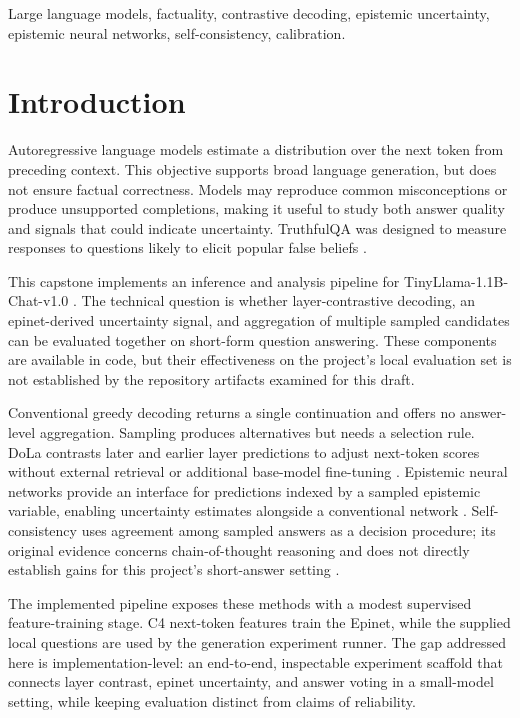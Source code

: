 \documentclass[conference]{IEEEtran}
\begin{document}
\begin{IEEEkeywords}
Large language models, factuality, contrastive decoding, epistemic uncertainty, epistemic neural networks, self-consistency, calibration.
\end{IEEEkeywords}

\section{Introduction}
Autoregressive language models estimate a distribution over the next token from preceding context. This objective supports broad language generation, but does not ensure factual correctness. Models may reproduce common misconceptions or produce unsupported completions, making it useful to study both answer quality and signals that could indicate uncertainty. TruthfulQA was designed to measure responses to questions likely to elicit popular false beliefs \cite{lin2022truthfulqa}.

This capstone implements an inference and analysis pipeline for TinyLlama-1.1B-Chat-v1.0 \cite{zhang2024tinyllama}. The technical question is whether layer-contrastive decoding, an epinet-derived uncertainty signal, and aggregation of multiple sampled candidates can be evaluated together on short-form question answering. These components are available in code, but their effectiveness on the project's local evaluation set is not established by the repository artifacts examined for this draft.

Conventional greedy decoding returns a single continuation and offers no answer-level aggregation. Sampling produces alternatives but needs a selection rule. DoLa contrasts later and earlier layer predictions to adjust next-token scores without external retrieval or additional base-model fine-tuning \cite{chuang2024dola}. Epistemic neural networks provide an interface for predictions indexed by a sampled epistemic variable, enabling uncertainty estimates alongside a conventional network \cite{osband2021enn}. Self-consistency uses agreement among sampled answers as a decision procedure; its original evidence concerns chain-of-thought reasoning and does not directly establish gains for this project's short-answer setting \cite{wang2023selfconsistency}.

The implemented pipeline exposes these methods with a modest supervised feature-training stage. C4 next-token features train the Epinet, while the supplied local questions are used by the generation experiment runner. The gap addressed here is implementation-level: an end-to-end, inspectable experiment scaffold that connects layer contrast, epinet uncertainty, and answer voting in a small-model setting, while keeping evaluation distinct from claims of reliability.
\end{document}
